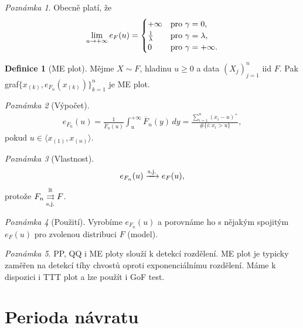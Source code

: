\documentclass{article}
\theoremstyle{remark}
\newtheorem*{remark}{Poznámka}
\theoremstyle{plain}
\theoremstyle{definition}
\newtheorem{definition}[subsubsection]{Definice}
\theoremstyle{remark}
\begin{document}
\begin{remark}
Obecně platí, že
\begin{align*}
    \lim_{u\rightarrow+\infty}e_F(u)=\begin{cases}
    +\infty & \textnormal{pro }\gamma=0, \\
    \frac{1}{\lambda} & \textnormal{pro }\gamma=\lambda, \\
    0 & \textnormal{pro }\gamma=+\infty.
    \end{cases}
\end{align*}
\end{remark}

\begin{definition}[ME plot]
Mějme $X\sim F$, hladinu $u\geq 0$ a data $(X_j)_{j=1}^n$ iid $F$. Pak graf\newline $\big\{x_{(k)},e_{F_n}(x_{(k)})\big\}_{k=1}^n$ je ME plot.
\end{definition}

\begin{remark}[Výpočet]
\begin{align*}
    e_{F_n}(u)=\frac{1}{\overline{F}_n(u)}\int_u^{+\infty}\overline{F}_n(y)\,dy=\frac{\sum_{i=1}^n(x_i-u)^{+}}{\#\{i:x_i>u\}},
\end{align*}
pokud $u\in\langle x_{(1)},x_{(n)}\rangle$.
\end{remark}

\begin{remark}[Vlastnost]
\begin{align*}
    e_{F_n}(u)\xrightarrow{\textnormal{s.j.}}e_F(u),
\end{align*}
protože $F_n\overset{\mathbb{R}}{\underset{\textnormal{s.j.}}{\rightrightarrows}}F$.
\end{remark}

\begin{remark}[Použití]
Vyrobíme $e_{F_n}(u)$ a porovnáme ho s nějakým spojitým $e_F(u)$ pro zvolenou distribuci $F$ (model).
\end{remark}

\begin{remark}
PP, QQ i ME ploty slouží k detekcí rozdělení. ME plot je typicky zaměřen na detekcí tíhy chvostů oproti exponenciálnímu rozdělení. Máme k dispozici i TTT plot a lze použít i GoF test.
\end{remark}

\section{Perioda návratu}
\end{document}

